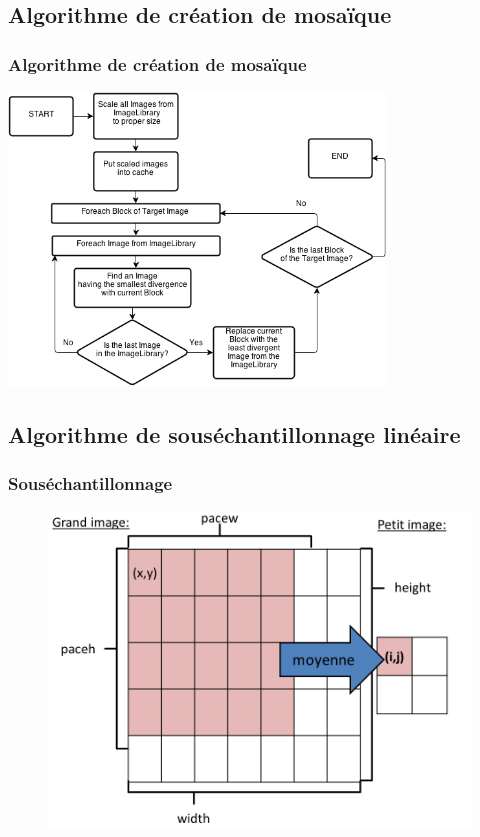 \documentclass[handout]{beamer}
\begin{document}
\subsection{Algorithme de cr\'eation de mosa\"ique}
\begin{frame}

\frametitle{\bf Algorithme de cr\'eation de mosa\"ique}
\begin{centering}
\includegraphics[width=0.75\textwidth]{the_mosaic_creation_algorithm.png}
\end{centering}
\end{frame}

\subsection{Algorithme de sous\'echantillonnage lin\'eaire}
\begin{frame}
\frametitle{\bf Sous\'echantillonnage}
\begin{figure}[H]
\includegraphics[scale=0.36]{scale_to.png}
\end{figure}
\end{frame}
\end{document}
